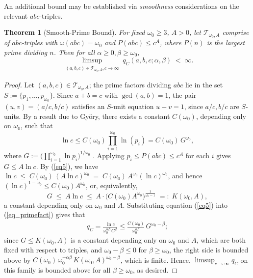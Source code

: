 \documentclass[11pt,letterpaper]{amsart}
\newtheorem{theorem}{Theorem}[section]
\def\ra{\rightarrow}
\begin{document}
An additional bound may be established via \textit{smoothness} considerations on the relevant $abc$-triples.

\begin{theorem}[Smooth-Prime Bound]\label{T_cond_UB_Baker}
    For fixed $\omega_0 \ge 3$, $A > 0$, let $\mathcal{T}_{\omega_0, A}$ comprise of $abc$-triples with $\omega(abc)=\omega_0$ and $P(abc) \le c^A$, where $P(n)$ is the largest prime dividing $n$. Then for all 
$\alpha \ge 0,\beta \ge \omega_0$,
\[
\limsup_{\substack{(a,b,c)\in\mathcal{T}_{\omega_0,A}, c\to\infty}} 
q_C(a,b,c;\alpha,\beta) \;<\; \infty.
\]
\end{theorem}

\begin{proof}
Let $(a,b,c)\in\mathcal{T}_{\omega_0,A}$; the prime factors dividing $abc$ lie in the set $S := \{p_1,\ldots,p_{\omega_0}\}$. 
Since $a+b=c$ with $\gcd(a,b)=1$, the pair $(u, v) = (a/c,b/c)$ satisfies an $S$-unit equation $u+v=1$, since $a/c, b/c$ are $S$-units. By a result due to Györy, there exists a constant $C(\omega_0)$, depending only on $\omega_0$, such that
\begin{equation}\label{eq5}
    \ln c \leq C(\omega_0)\prod_{i=1}^{\omega_0} \ln(p_i) =C(\omega_0)\,G^{\omega_0},
\end{equation}
where $G := \bigl(\prod_{i=1}^{\omega_0}\ln p_i\bigr)^{1/\omega_0}$ \cite{gyory1979explicit}. Applying $p_i \le P(abc) \le c^A$ for each $i$ gives $G \le A\ln c$. By (\ref{eq5}), we have $ \ln c \;\le\; C(\omega_0)\,(A\ln c)^{\omega_0} \;=\; C(\omega_0)\,A^{\omega_0}(\ln c)^{\omega_0}$, and hence $(\ln c)^{1-\omega_0} \le C(\omega_0) A^{\omega_0}$, or, equivalently,
\begin{equation}\label{eq_G_bound}
    G \;\le\; A\ln c \;\le\; A\cdot\bigl(C(\omega_0)A^{\omega_0}\bigr)^{\frac{1}{\omega_0-1}} 
    \;=:\; K(\omega_0, A),
\end{equation}
a constant depending only on $\omega_0$ and $A$. Substituting equation (\ref{eq5}) into (\ref{eq_primefact}) gives that
\begin{align*}
    q_C = \frac{\ln c}{\omega_0^{\alpha\beta}\,G^\beta} \leq 
    \frac{C(\omega_0)}{\omega_0^{\alpha\beta}}\,G^{\omega_0-\beta};
\end{align*}
since $G \le K(\omega_0, A)$ is a constant depending only on $\omega_0$ and $A$, which are both fixed with respect to triples, and 
$\omega_0 - \beta \le 0$ for $\beta \ge \omega_0$, the right side is bounded above by 
$C(\omega_0)\,\omega_0^{-\alpha\beta}\,K(\omega_0,A)^{\omega_0-\beta}$, 
which is finite. Hence, $\limsup_{c \ra \infty} q_C$ on this family is bounded above for all $\beta \ge \omega_0$, as desired.
\end{proof}
\end{document}
